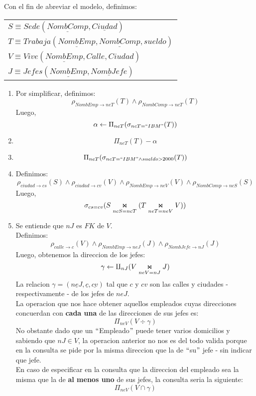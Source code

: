 Con el fin de abreviar el modelo, definimos:
\begin{center}
	\begin{tabular}{l}
		$S \equiv Sede(\underline{NombComp}, \underline{Ciudad})$\\
		$T \equiv Trabaja(\underline{NombEmp}, \underline{NombComp}, sueldo)$\\
		$V \equiv Vive(\underline{NombEmp}, Calle, Ciudad)$\\
		$J \equiv Jefes(\underline{NombEmp}, \underline{NombJefe})$\\
	\end{tabular}
\end{center}
\begin{enumerate}
	\item Por simplificar, definimos:
	$$\rho_{NombEmp\rightarrow neT} (T) \land \rho_{NombComp\rightarrow ncT} (T)$$
	Luego,
	$$\alpha \leftarrow \Pi_{neT}(\sigma_{ncT = ``IBM"} (T))$$
	
	\item
	$$\Pi_{neT}(T)-\alpha$$
	
	\item
	$$\Pi_{neT}(\sigma_{ncT = ``IBM" \land sueldo > 2000}(T))$$
	
	\item Definimos:
	$$\rho_{ciudad \rightarrow cs} (S) \land \rho_{ciudad \rightarrow cv}(V) \land \rho_{NombEmp\rightarrow neV} (V) \land \rho_{NombComp\rightarrow ncS} (S)$$
	Luego,
	$$\sigma_{cs = cv}(S\innerjoin[ncS = ncT] (T\innerjoin[neT = neV] V))$$
	
	\item Se entiende que $nJ$ es $FK$ de $V$.\\ 
	Definimos:
	$$\rho_{calle\rightarrow c}(V) \land \rho_{NombEmp\rightarrow neJ}(J) \land \rho_{NombJefe \rightarrow nJ}(J)$$
	Luego, obtenemos la direccion de los jefes:
	$$\gamma \leftarrow \amalg_{nJ}(V \innerjoin[neV = nJ] J)$$
	La relacion $\gamma = (\underline{neJ}, \underline{c}, \underline{cv})$ tal que $c$ y $cv$ son las calles y ciudades - respectivamente - de los jefes de $neJ$.\\
	La operacion que nos hace obtener aquellos empleados cuyas direcciones concuerdan con \textbf{cada una} de las direcciones de sus jefes es:
	$$\Pi_{neV} (V \div \gamma)$$
	No obstante dado que un $``$Empleado$"$  puede tener varios domicilios y sabiendo que $nJ \in V$, la operacion anterior no nos es del todo valida porque en la consulta se pide por la misma direccion que la de $``$su$"$ jefe - sin indicar que jefe.\\
	En caso de especificar en la consulta que la direccion del empleado sea la misma que la de \textbf{al menos uno} de sus jefes, la consulta seria la siguiente:
	$$\Pi_{neV}(V\cap \gamma)$$
	

\end{enumerate}
